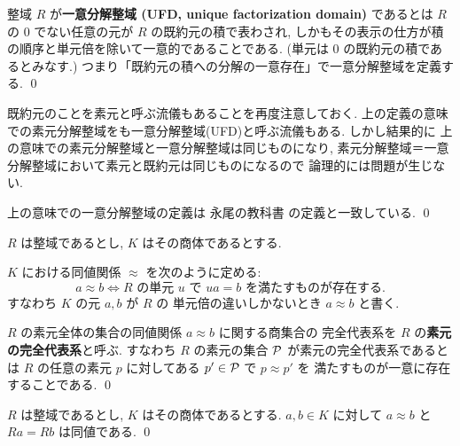 \documentclass[12pt,twoside]{jarticle}
\begin{document}
\begin{definition}[一意分解整域]
 整域 $R$ が{\bf 一意分解整域 (UFD, unique factorization domain)} であるとは %
 $R$ の $0$ でない任意の元が $R$ の既約元の積で表わされ, 
 しかもその表示の仕方が積の順序と単元倍を除いて一意的であることである.
 (単元は $0$ の既約元の積であるとみなす.)
 つまり「既約元の積への分解の一意存在」で一意分解整域を定義する.
 \qed
\end{definition}

\begin{rem}[用語法に関する注意]
 既約元のことを素元と呼ぶ流儀もあることを再度注意しておく. 
 上の定義の意味での素元分解整域をも一意分解整域(UFD)と呼ぶ流儀もある.
 しかし結果的に
 上の意味での素元分解整域と一意分解整域は同じものになり, 
 素元分解整域＝一意分解整域において素元と既約元は同じものになるので
 論理的には問題が生じない.

 上の意味での一意分解整域の定義は
 永尾の教科書 \cite{nagao-1983} の定義と一致している.
 \qed
\end{rem}

\begin{definition}
 $R$ は整域であるとし, $K$ はその商体であるとする.

 $K$ における同値関係 $\approx$ を次のように定める:
 \begin{equation*}
  a\approx b \iff 
  \text{$R$ の単元 $u$ で $ua=b$ を満たすものが存在する.}
 \end{equation*}
 すなわち $K$ の元 $a,b$ が $R$ の
 単元倍の違いしかないとき $a\approx b$ と書く. 

 $R$ の素元全体の集合の同値関係 $a\approx b$ に関する商集合の
 完全代表系を $R$ の{\bf 素元の完全代表系}と呼ぶ.
 すなわち $R$ の素元の集合 ${\mathcal P}$ が素元の完全代表系であるとは %
 $R$ の任意の素元 $p$ に対してある $p'\in{\mathcal P}$ で $p\approx p'$ を
 満たすものが一意に存在することである.
 \qed
\end{definition}

\begin{question}
 $R$ は整域であるとし, $K$ はその商体であるとする.
 $a,b\in K$ に対して $a\approx b$ と $Ra=Rb$ は同値である.
 \qed
\end{question}
\end{document}
